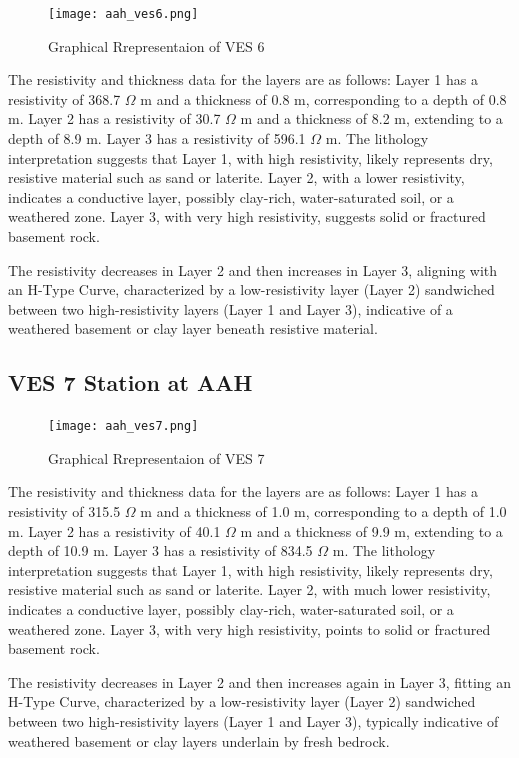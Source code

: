 \documentclass[12pt,a4paper]{report}
\begin{document}
\begin{figure}[H]
    \centering
    \texttt{[image: aah\_ves6.png]}
    \caption{Graphical Rrepresentaion of VES 6}
    \label{fig:AAH_VES_6_Curve}
\end{figure}
The resistivity and thickness data for the layers are as follows: Layer 1 has a resistivity of 368.7 $\Omega$ m and a thickness of 0.8 m, corresponding to a depth of 0.8 m. Layer 2 has a resistivity of 30.7 $\Omega$ m and a thickness of 8.2 m, extending to a depth of 8.9 m. Layer 3 has a resistivity of 596.1 $\Omega$ m. The lithology interpretation suggests that Layer 1, with high resistivity, likely represents dry, resistive material such as sand or laterite. Layer 2, with a lower resistivity, indicates a conductive layer, possibly clay-rich, water-saturated soil, or a weathered zone. Layer 3, with very high resistivity, suggests solid or fractured basement rock. 

The resistivity decreases in Layer 2 and then increases in Layer 3, aligning with an H-Type Curve, characterized by a low-resistivity layer (Layer 2) sandwiched between two high-resistivity layers (Layer 1 and Layer 3), indicative of a weathered basement or clay layer beneath resistive material.

\subsection{VES 7 Station at AAH}

\begin{figure}[H]
    \centering
    \texttt{[image: aah\_ves7.png]}
    \caption{Graphical Rrepresentaion of VES 7}
    \label{fig:AAH_VES_7_Curve}
\end{figure}
The resistivity and thickness data for the layers are as follows: Layer 1 has a resistivity of 315.5 $\Omega$ m and a thickness of 1.0 m, corresponding to a depth of 1.0 m. Layer 2 has a resistivity of 40.1 $\Omega$ m and a thickness of 9.9 m, extending to a depth of 10.9 m. Layer 3 has a resistivity of 834.5 $\Omega$ m. The lithology interpretation suggests that Layer 1, with high resistivity, likely represents dry, resistive material such as sand or laterite. Layer 2, with much lower resistivity, indicates a conductive layer, possibly clay-rich, water-saturated soil, or a weathered zone. Layer 3, with very high resistivity, points to solid or fractured basement rock.

The resistivity decreases in Layer 2 and then increases again in Layer 3, fitting an H-Type Curve, characterized by a low-resistivity layer (Layer 2) sandwiched between two high-resistivity layers (Layer 1 and Layer 3), typically indicative of weathered basement or clay layers underlain by fresh bedrock.
\end{document}

